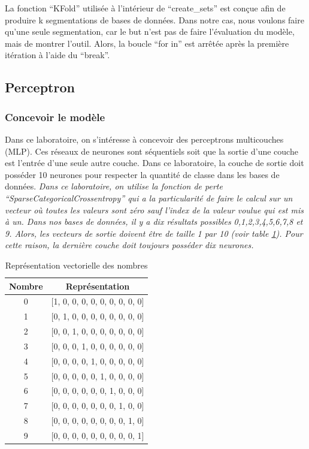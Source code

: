 \documentclass{article}
\begin{document}
La fonction ``KFold'' utilisée à l'intérieur de ``create\_sets'' est conçue afin de produire k segmentations de bases de données. Dans notre cas, nous voulons faire qu'une seule segmentation, car le but n'est pas de faire l'évaluation du modèle, mais de montrer l'outil. Alors, la boucle ``for in'' est arrêtée après la première itération à l'aide du ``break''.

\subsection{Perceptron}
\subsubsection{Concevoir le modèle}
Dans ce laboratoire, on s'intéresse à concevoir des perceptrons multicouches (MLP). Ces réseaux de neurones sont séquentiels soit que la sortie d'une couche est l'entrée d'une seule autre couche. Dans ce laboratoire, la couche de sortie doit posséder 10 neurones pour respecter la quantité de classe dans les bases de données.
\medbreak
\textit{Dans ce laboratoire, on utilise la fonction de perte ``SparseCategoricalCrossentropy'' qui a la particularité de faire le calcul sur un vecteur où toutes les valeurs sont zéro sauf l'index de la valeur voulue qui est mis à un. Dans nos bases de données, il y a dix résultats possibles 0,1,2,3,4,5,6,7,8 et 9. Alors, les vecteurs de sortie doivent être de taille 1 par 10 (voir table \ref{tab:representation}). Pour cette raison, la dernière couche doit toujours posséder dix neurones.}

\begin{table}[H]
  \caption{Représentation vectorielle des nombres}
  \label{tab:representation}
  \centering
  \begin{tabular}{|c|c|}
    \hline
    Nombre & Représentation \\
    \hline
    0 & [1, 0, 0, 0, 0, 0, 0, 0, 0, 0] \\
    \hline
    1 & [0, 1, 0, 0, 0, 0, 0, 0, 0, 0] \\
    \hline
    2 & [0, 0, 1, 0, 0, 0, 0, 0, 0, 0] \\
    \hline
    3 & [0, 0, 0, 1, 0, 0, 0, 0, 0, 0] \\
    \hline
    4 & [0, 0, 0, 0, 1, 0, 0, 0, 0, 0] \\
    \hline
    5 & [0, 0, 0, 0, 0, 1, 0, 0, 0, 0] \\
    \hline
    6 & [0, 0, 0, 0, 0, 0, 1, 0, 0, 0] \\
    \hline
    7 & [0, 0, 0, 0, 0, 0, 0, 1, 0, 0] \\
    \hline
    8 & [0, 0, 0, 0, 0, 0, 0, 0, 1, 0] \\
    \hline
    9 & [0, 0, 0, 0, 0, 0, 0, 0, 0, 1] \\
    \hline
  \end{tabular}
\end{table}
\end{document}
